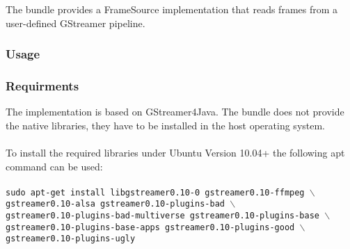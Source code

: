 
The bundle provides a FrameSource implementation that reads frames from a user-defined GStreamer pipeline.

\subsubsection{Usage}

\subsubsection{Requirments}

The implementation is based on GStreamer4Java. The bundle does not provide the native libraries, they have to be installed in the host operating system.
\\~\\
To install the required libraries under Ubuntu Version 10.04+ the following apt command can be used:
\\~\\
\texttt{sudo apt-get install libgstreamer0.10-0 gstreamer0.10-ffmpeg $\backslash$ \\
gstreamer0.10-alsa gstreamer0.10-plugins-bad $\backslash$ \\
gstreamer0.10-plugins-bad-multiverse gstreamer0.10-plugins-base $\backslash$ \\
gstreamer0.10-plugins-base-apps gstreamer0.10-plugins-good $\backslash$ \\
gstreamer0.10-plugins-ugly}
